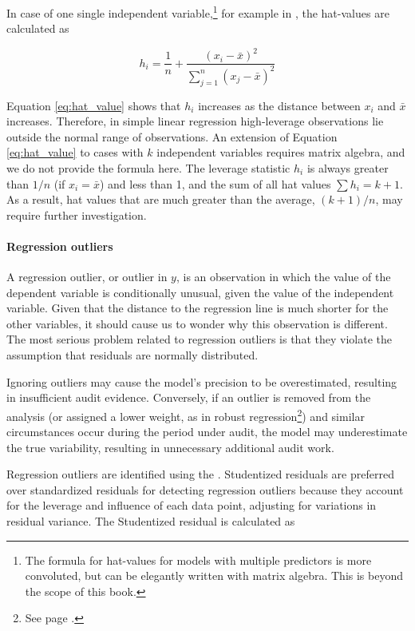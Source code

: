 In case of one single independent variable,\footnote{The formula for hat-values for models with multiple predictors is more convoluted, but can be elegantly written with matrix algebra. This is beyond the scope of this book.} for example in \newline \noindent {}, the hat-values are calculated as

\begin{equation}
\label{eq:hat_value}
  h_i = \frac{1}{n} + \frac{(x_i - \bar{x})^2}{\sum_{j=1}^{n}(x_j - \bar{x})^2}
\end{equation}

Equation \ref{eq:hat_value} shows that $h_i$ increases as the distance between $x_i$ and $\bar{x}$ increases. Therefore, in simple linear regression high-leverage observations lie outside the normal range of observations. An extension of Equation \ref{eq:hat_value} to cases with $k$ independent variables requires matrix algebra, and we do not provide the formula here. The leverage statistic $h_i$ is always greater than $1 / n$ (if $x_i = \bar{x}$) and less than 1, and the sum of all hat values $\sum h_i = k + 1 $. As a result, hat values that are much greater than the average, $(k + 1) / n$, may require further investigation.

\paragraph{Regression outliers} A regression outlier, or outlier in $y$, is an observation in which the value of the dependent variable is conditionally unusual, given the value of the independent variable. Given that the distance to the regression line is much shorter for the other variables, it should cause us to wonder why this observation is different. The most serious problem related to regression outliers is that they violate the assumption that residuals are normally distributed.

Ignoring outliers may cause the model's precision to be overestimated, resulting in insufficient audit evidence. Conversely, if an outlier is removed from the analysis (or assigned a lower weight, as in robust regression\footnote{See page \pageref{par:robust_regression}.}) and similar circumstances occur during the period under audit, the model may underestimate the true variability, resulting in unnecessary additional audit work.

Regression outliers are identified using the . 
Studentized residuals are preferred over standardized residuals for detecting regression outliers because they account for the leverage and influence of each data point, adjusting for variations in residual variance. 
The Studentized residual is calculated as

